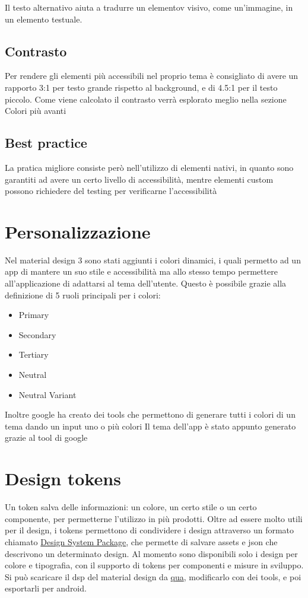 \documentclass[12pt, a4paper]{report}
\begin{document}
			Il testo alternativo aiuta a tradurre un elementov visivo, come un'immagine, in un elemento testuale.
		\subsection{Contrasto}
			Per rendere gli elementi più accessibili nel proprio tema è consigliato di avere un rapporto 3:1 per testo grande rispetto al background, e di 4.5:1 per il testo piccolo. Come viene calcolato il contrasto verrà esplorato meglio nella sezione Colori più avanti

		\subsection{Best practice}
			La pratica migliore consiste però nell'utilizzo di elementi nativi, in quanto sono garantiti ad avere un certo livello di accessibilità, mentre elementi custom possono richiedere del testing per verificarne l'accessibilità
	\section{Personalizzazione}
		Nel material design 3 sono stati aggiunti i colori dinamici, i quali permetto ad un app di mantere un suo stile e accessibilità ma allo stesso tempo permettere all'applicazione di adattarsi al tema dell'utente.
		Questo è possibile grazie alla definizione di 5 ruoli principali per i colori:
		\begin{itemize}
			\item Primary
			\item Secondary
			\item Tertiary
			\item Neutral
			\item Neutral Variant
		\end{itemize}
		Inoltre google ha creato dei tools che permettono di generare tutti i colori di un tema dando un input uno o più colori
		Il tema dell'app è stato appunto generato grazie al tool di google
		
	\section{Design tokens}
		Un token salva delle informazioni: un colore, un certo stile o un certo componente, per permetterne l'utilizzo in più prodotti.
		Oltre ad essere molto utili per il design, i tokens permettono di condividere i design attraverso un formato chiamato \href{https://github.com/AdobeXD/design-system-package-dsp}{Design System Package},
		che permette di salvare assets e json che descrivono un determinato design.
		Al momento sono disponibili solo i design per colore e tipografia, con il supporto di tokens per componenti e misure in sviluppo. Si può scaricare il dsp del material design da \href{https://github.com/material-foundation/material-tokens}{qua}, modificarlo con dei tools, e poi esportarli per android.
		
\end{document}
